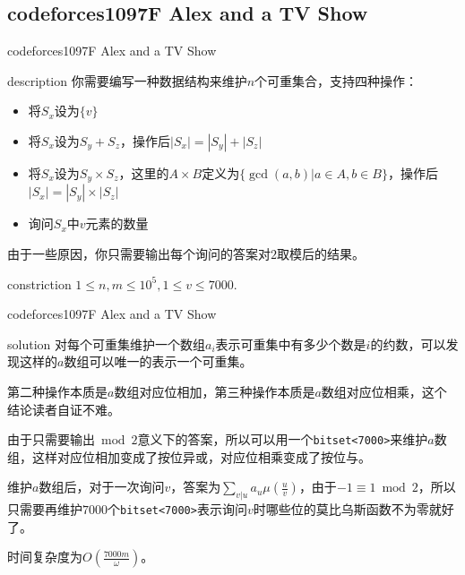 \documentclass{beamer}
\begin{document}
	\subsection{codeforces1097F Alex and a TV Show}
	\begin{frame}{codeforces1097F Alex and a TV Show}
		\begin{block}{description}
			你需要编写一种数据结构来维护$n$个可重集合，支持四种操作：
			\begin{itemize}
				\item 将$S_x$设为$\{v\}$
				\item 将$S_x$设为$S_y + S_z$，操作后$|S_x|=|S_y|+|S_z|$
				\item 将$S_x$设为$S_y\times S_z$，这里的$A \times B$定义为$\{\gcd(a,b)|a\in A, b\in B\}$，操作后$|S_x|=|S_y|\times|S_z|$
				\item 询问$S_x$中$v$元素的数量
			\end{itemize}
			
			由于一些原因，你只需要输出每个询问的答案对$2$取模后的结果。
		\end{block}
		\begin{block}{constriction}
			$1\le n, m \le 10^5, 1 \le v \le 7000.$
		\end{block}
	\end{frame}
	\begin{frame}{codeforces1097F Alex and a TV Show}
		\begin{block}{solution}
			对每个可重集维护一个数组$a_i$表示可重集中有多少个数是$i$的约数，可以发现这样的$a$数组可以唯一的表示一个可重集。
			
			第二种操作本质是$a$数组对应位相加，第三种操作本质是$a$数组对应位相乘，这个结论读者自证不难。
			
			由于只需要输出$\bmod 2$意义下的答案，所以可以用一个\texttt{bitset<7000>}来维护$a$数组，这样对应位相加变成了按位异或，对应位相乘变成了按位与。
			
			维护$a$数组后，对于一次询问$v$，答案为$\sum_{v|u}a_u\mu(\frac{u}{v})$，由于$-1 \equiv 1 \bmod 2$，所以只需要再维护$7000$个\texttt{bitset<7000>}表示询问$v$时哪些位的莫比乌斯函数不为零就好了。
			
			时间复杂度为$O(\frac{7000m}{\omega})$。
		\end{block}
	\end{frame}
	
\end{document}
